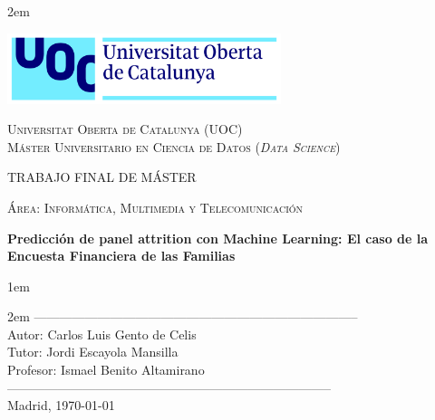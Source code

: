 \newpage
\thispagestyle{empty}

\baselineskip 2em


\centerline{\includegraphics[width=0.6\textwidth]{images/UOC-logo}}
\begin{center}
\textsc{Universitat Oberta de Catalunya (UOC) \\
 Máster Universitario en Ciencia de Datos (\textit{Data Science})\\}


\vspace*{1.5cm}

\textsc{\Large TRABAJO FINAL DE MÁSTER}

\vspace*{0.5cm}

\textsc{\large Área: Informática, Multimedia y Telecomunicación}



\vspace*{2.0cm}

\textbf{\Large Predicción de panel attrition con Machine Learning: El caso de la Encuesta Financiera de las Familias}

\textbf{\large }

\vspace{2.5cm}
\baselineskip 1em

\baselineskip 2em
-----------------------------------------------------------------------------\\
Autor:      Carlos Luis Gento de Celis\\
Tutor:      Jordi Escayola Mansilla\\
Profesor:   Ismael Benito Altamirano\\
-----------------------------------------------------------------------------\\
\vspace*{1.5cm}
Madrid, \today

\end{center}

\newpage
\pagestyle{empty}
\hfill
